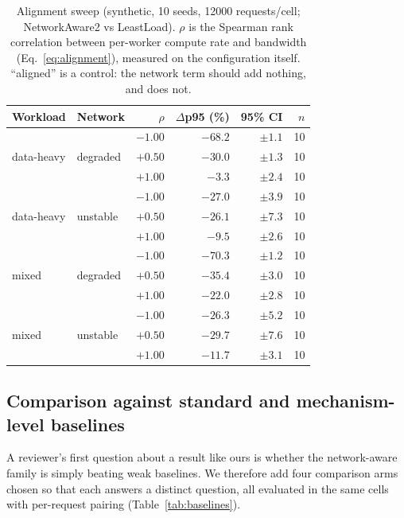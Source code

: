 \begin{table}[t]
\centering
\caption{Alignment sweep (synthetic, 10 seeds, \num{12000} requests/cell; NetworkAware2 vs
LeastLoad). $\rho$ is the Spearman rank correlation between per-worker compute rate and
bandwidth (Eq.~\ref{eq:alignment}), measured on the configuration itself. ``aligned'' is a
control: the network term should add nothing, and does not.}
\label{tab:alignment}
\small
\begin{tabular}{@{}llrrrr@{}}
\toprule
Workload & Network & $\rho$ & $\Delta$p95 (\%) & 95\% CI & $n$ \\
\midrule
\multirow{3}{*}{data-heavy} & \multirow{3}{*}{degraded}
  & $-1.00$ & $-68.2$ & $\pm1.1$ & 10 \\
  & & $+0.50$ & $-30.0$ & $\pm1.3$ & 10 \\
  & & $+1.00$ & $-3.3$ & $\pm2.4$ & 10 \\
\multirow{3}{*}{data-heavy} & \multirow{3}{*}{unstable}
  & $-1.00$ & $-27.0$ & $\pm3.9$ & 10 \\
  & & $+0.50$ & $-26.1$ & $\pm7.3$ & 10 \\
  & & $+1.00$ & $-9.5$ & $\pm2.6$ & 10 \\
\multirow{3}{*}{mixed} & \multirow{3}{*}{degraded}
  & $-1.00$ & $-70.3$ & $\pm1.2$ & 10 \\
  & & $+0.50$ & $-35.4$ & $\pm3.0$ & 10 \\
  & & $+1.00$ & $-22.0$ & $\pm2.8$ & 10 \\
\multirow{3}{*}{mixed} & \multirow{3}{*}{unstable}
  & $-1.00$ & $-26.3$ & $\pm5.2$ & 10 \\
  & & $+0.50$ & $-29.7$ & $\pm7.6$ & 10 \\
  & & $+1.00$ & $-11.7$ & $\pm3.1$ & 10 \\
\bottomrule
\end{tabular}
\end{table}

\subsection{Comparison against standard and mechanism-level baselines}
\label{sec:rq1:baselines}
A reviewer's first question about a result like ours is whether the network-aware family is simply
beating weak baselines. We therefore add four comparison arms chosen so that each answers a
distinct question, all evaluated in the same cells with per-request pairing
(Table~\ref{tab:baselines}).


